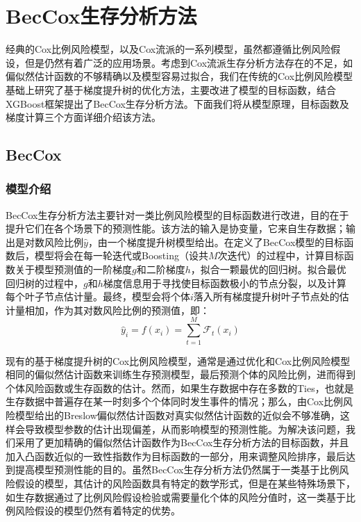 \chapter{BecCox生存分析方法}

经典的Cox比例风险模型，以及Cox流派的一系列模型，虽然都遵循比例风险假设，但是仍然有着广泛的应用场景。考虑到Cox流派生存分析方法存在的不足，如偏似然估计函数的不够精确以及模型容易过拟合，我们在传统的Cox比例风险模型基础上研究了基于梯度提升树的优化方法，主要改进了模型的目标函数，结合XGBoost框架提出了BecCox生存分析方法。下面我们将从模型原理，目标函数及梯度计算三个方面详细介绍该方法。

\section{BecCox}

\subsection{模型介绍}

BecCox生存分析方法主要针对一类比例风险模型的目标函数进行改进，目的在于提升它们在各个场景下的预测性能。该方法的输入是协变量，它来自生存数据；输出是对数风险比例$\hat{y}$，由一个梯度提升树模型给出。在定义了BecCox模型的目标函数后，模型将会在每一轮迭代或Boosting（设共$M$次迭代）的过程中，计算目标函数关于模型预测值的一阶梯度$g$和二阶梯度$h$，拟合一颗最优的回归树。拟合最优回归树的过程中，$g$和$h$梯度信息用于寻找使目标函数极小的节点分裂，以及计算每个叶子节点估计量。最终，模型会将个体$i$落入所有梯度提升树叶子节点处的估计量相加，作为其对数风险比例的预测值，即：$$
\hat{y}_i = f(x_i) = \sum_{t=1}^{M} \mathcal{F}_t (x_i)
$$

现有的基于梯度提升树的Cox比例风险模型，通常是通过优化和Cox比例风险模型相同的偏似然估计函数来训练生存预测模型，最后预测个体的风险比例，进而得到个体风险函数或生存函数的估计。然而，如果生存数据中存在多数的Ties，也就是生存数据中普遍存在某一时刻多个个体同时发生事件的情况；那么，由Cox比例风险模型给出的Breslow偏似然估计函数对真实似然估计函数的近似会不够准确，这样会导致模型参数的估计出现偏差，从而影响模型的预测性能。为解决该问题，我们采用了更加精确的偏似然估计函数作为BecCox生存分析方法的目标函数，并且加入凸函数近似的一致性指数作为目标函数的一部分，用来调整风险排序，最后达到提高模型预测性能的目的。虽然BecCox生存分析方法仍然属于一类基于比例风险假设的模型，其估计的风险函数具有特定的数学形式，但是在某些特殊场景下，如生存数据通过了比例风险假设检验或需要量化个体的风险分值时，这一类基于比例风险假设的模型仍然有着特定的优势。

